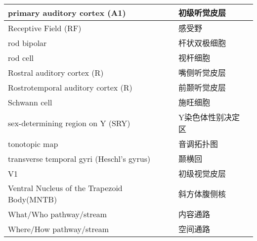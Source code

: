 \begin{table}[htbp]
{\begin{tabular}{llll}
		\midrule
		primary auditory cortex (A1)   && 初级听觉皮层  \\
		
		\midrule
		Receptive Field (RF)   && 感受野  \\
		
		\midrule
		rod bipolar   && 杆状双极细胞  \\
		
		\midrule
		rod cell   && 视杆细胞  \\
		
		\midrule
		Rostral auditory cortex (R)   && 嘴侧听觉皮层  \\
		
		\midrule
		Rostrotemporal auditory cortex (R)   && 前颞听觉皮层 \\
		
		\midrule
		Schwann cell   && 施旺细胞 \\
		
		\midrule
		sex-determining region on Y (SRY)   && Y染色体性别决定区 \\
		
		\midrule
		tonotopic map   && 音调拓扑图  \\
		
		\midrule
		transverse temporal gyri (Heschl's gyrus)   && 颞横回  \\
		
		\midrule
		V1   && 初级视觉皮层  \\
		
		\midrule
		Ventral Nucleus of the Trapezoid Body(MNTB)   && 斜方体腹侧核  \\
		
		\midrule
		What/Who pathway/stream  && 内容通路  \\
		
		\midrule
		Where/How pathway/stream && 空间通路  \\
		
		
		\bottomrule  

	\end{tabular}}
\end{table}%

